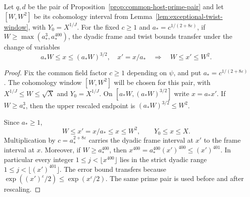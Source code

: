 \begin{lemma}\label{lem:host-rescaling}
Let \(q,d\) be the pair of Proposition~\ref{prop:common-host-prime-pair}
and let \([W,W^2]\) be its cohomology interval from
Lemma~\ref{lem:exceptional-twist-window}, with \(Y_0=X^{1/J}\).
For the fixed \(c\ge1\) and \(a_*=c^{1/(2+8\varepsilon)}\), if
\(W\ge\max(a_*^3,a_*^{400})\), the dyadic frame and twist bounds transfer under the change of variables 
\[
 a_*W\le x\le (a_*W)^{3/2},\quad x'=x/a_*\quad\Longrightarrow\quad W\le x'\le W^2.
\]

\end{lemma}

\begin{proof}

Fix the common field factor \(c\ge1\) depending on \(\psi\), and
put \(a_*=c^{1/(2+8\varepsilon)}\). The cohomology window
\([W,W^2]\) will be chosen for this pair, with
\(X^{1/J}\le W\le\sqrt X\) and \(Y_0=X^{1/J}\).
On \([a_*W,(a_*W)^{3/2}]\) write \(x=a_*x'\).
If \(W\ge a_*^3\), then the upper rescaled endpoint is
\((a_*W)^{3/2}\le W^2\).

Since \(a_*\ge1\),
\[
 W\le x'=x/a_*\le x\le W^2,
 \qquad Y_0\le x\le X.
\]
Multiplication by \(c=a_*^{2+8\varepsilon}\) carries the
dyadic frame interval at \(x'\) to the frame interval at
\(x\). Moreover, if \(W\ge a_*^{400}\), then
\(x^{400}=a_*^{400}(x')^{400}\le(x')^{401}\).
In particular every integer \(1\le j<\lfloor x^{400}\rfloor\)
lies in the strict dyadic range \(1\le j<\lfloor(x')^{401}\rfloor\).
The error bound transfers because
\(\exp((x')^\varepsilon/2)\le\exp(x^\varepsilon/2)\).
The same prime pair is used before and after rescaling.
\end{proof}
